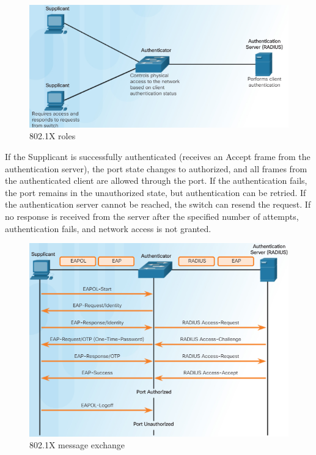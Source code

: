 \begin{figure}[hbtp]
\caption{802.1X roles}\label{802.1X}
\centering
\includegraphics[scale=0.7]{pictures/8021X.PNG}
\end{figure}

If the Supplicant is successfully authenticated (receives an Accept frame from the authentication server), the port state changes to authorized, and all frames from the authenticated client are allowed through the port. If the authentication fails, the port remains in the unauthorized state, but authentication can be retried. If the authentication server cannot be reached, the switch can resend the request. If no response is received from the server after the specified number of attempts, authentication fails, and network access is not granted.

\begin{figure}[hbtp]
\caption{802.1X message exchange}\label{MessageExchange}
\centering
\includegraphics[scale=0.7]{pictures/MessageExchange.PNG}
\end{figure}

